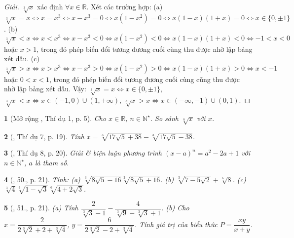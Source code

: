 \documentclass{article}
\newtheorem{baitoan}{}%
\begin{document}
\begin{proof}[Giải]
	$\sqrt[3]{x}$ xác định $\forall x\in\mathbb{R}$. Xét các trường hợp: (a) $\sqrt[3]{x} = x\Leftrightarrow x = x^3\Leftrightarrow x - x^3 = 0\Leftrightarrow x(1 - x^2) = 0\Leftrightarrow x(1 - x)(1 + x) = 0\Leftrightarrow x\in\{0,\pm1\}$. (b) $\sqrt[3]{x} < x\Leftrightarrow x < x^3\Leftrightarrow x - x^3 < 0\Leftrightarrow x(1 - x^2) < 0\Leftrightarrow x(1 - x)(1 + x) < 0\Leftrightarrow -1 < x < 0$ hoặc $x > 1$, trong đó phép biến đổi tương đương cuối cùng thu được nhờ lập bảng xét dấu. (c) $\sqrt[3]{x} > x\Leftrightarrow x > x^3\Leftrightarrow x - x^3 > 0\Leftrightarrow x(1 - x^2) > 0\Leftrightarrow x(1 - x)(1 + x) > 0\Leftrightarrow x < -1$ hoặc $0 < x < 1$, trong đó phép biến đổi tương đương cuối cùng cũng thu được nhờ lập bảng xét dấu. Vậy: $\sqrt[3]{x} = x\Leftrightarrow x\in\{0,\pm1\}$, $\sqrt[3]{x} < x\Leftrightarrow x\in(-1,0)\cup(1,+\infty)$, $\sqrt[3]{x} > x\Leftrightarrow x\in(-\infty,-1)\cup(0,1)$.
\end{proof}

\begin{baitoan}[Mở rộng \cite{Tuyen_Toan_9_old}, Thí dụ 1, p. 5]
	Cho $x\in\mathbb{R}$, $n\in\mathbb{N}^\star$. So sánh $\sqrt[n]{x}$ với $x$.
\end{baitoan}

\begin{baitoan}[\cite{Tuyen_Toan_9_old}, Thí dụ 7, p. 19]
	Tính $x = \sqrt[3]{17\sqrt{5} + 38} - \sqrt[3]{17\sqrt{5} - 38}$.
\end{baitoan}

\begin{baitoan}[\cite{Tuyen_Toan_9_old}, Thí dụ 8, p. 20]
	Giải \& biện luận phương trình $(x - a)^n = a^2 - 2a + 1$ với $n\in\mathbb{N}^\star$, $a$ là tham số.
\end{baitoan}

\begin{baitoan}[\cite{Tuyen_Toan_9_old}, 50., p. 21]
	Tính: (a) $\sqrt[3]{8\sqrt{5} - 16}\sqrt[3]{8\sqrt{5} + 16}$. (b) $\sqrt[3]{7 - 5\sqrt{2}} + \sqrt[6]{8}$. (c) $\sqrt[3]{4}\sqrt[3]{1 - \sqrt{3}}\sqrt[6]{4 + 2\sqrt{3}}$.
\end{baitoan}

\begin{baitoan}[\cite{Tuyen_Toan_9_old}, 51., p. 21]
	(a) Tính $\dfrac{2}{\sqrt[3]{3} - 1} - \dfrac{4}{\sqrt[3]{9} - \sqrt[3]{3} + 1}$. (b) Cho $x = \dfrac{2}{2\sqrt[3]{2} + 2 + \sqrt[3]{4}}$, $y = \dfrac{6}{2\sqrt[3]{2} - 2 + \sqrt[3]{4}}$. Tính giá trị của biểu thức $P = \dfrac{xy}{x + y}$.
\end{baitoan}
\end{document}
